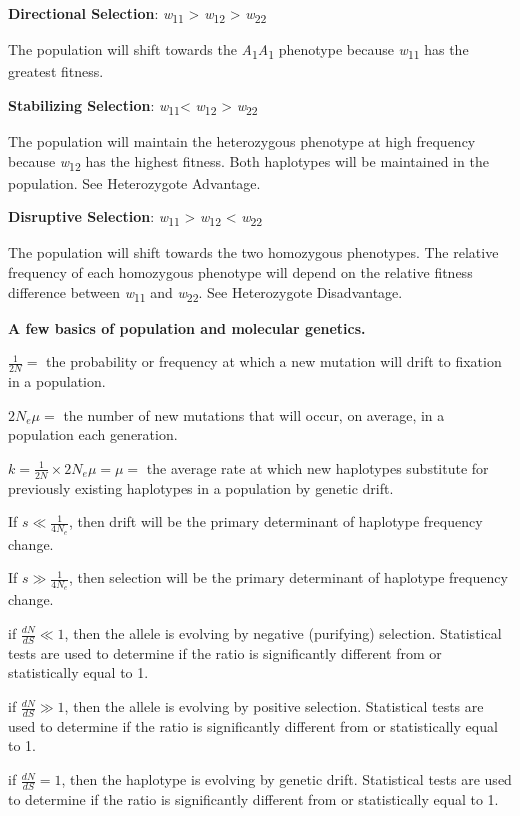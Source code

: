 \documentclass[11pt]{article}
\begin{document}
\textbf{Directional Selection}: \emph{w}\textsubscript{11}
\textgreater{} \emph{w}\textsubscript{12} \textgreater{}
\emph{w}\textsubscript{22}

\qquad The population will shift towards the
\emph{A}\textsubscript{1}\emph{A}\textsubscript{1} phenotype because
\emph{w}\textsubscript{11} has the greatest fitness.\medskip

\textbf{Stabilizing Selection}: \emph{w}\textsubscript{11}\textless{}
\emph{w}\textsubscript{12} \textgreater{} \emph{w}\textsubscript{22}

\qquad The population will maintain the heterozygous phenotype at high
frequency because \emph{w}\textsubscript{12} has the highest fitness.
Both haplotypes will be maintained in the population. See Heterozygote
Advantage.\medskip

\textbf{Disruptive Selection}: \emph{w}\textsubscript{11} \textgreater{}
\emph{w}\textsubscript{12} \textless{} \emph{w}\textsubscript{22}

\qquad The population will shift towards the two homozygous phenotypes. The
relative frequency of each homozygous phenotype will depend on the
relative fitness difference between \emph{w}\textsubscript{11} and
\emph{w}\textsubscript{22}. See Heterozygote Disadvantage.\medskip

\textbf{A few basics of population and molecular genetics.}

$\frac{1}{2N} =$ the probability or frequency at which a new mutation will drift to
fixation in a population.\medskip

$2N_e\mu =$ the number of new mutations that will
occur, on average, in a population each generation.\medskip

$k = \frac{1}{2N} \times 2N_e\mu = \mu =$ the average rate at which new haplotypes substitute for previously
existing haplotypes in a population by genetic drift.\medskip

If $s \ll \frac{1}{4N_e}$, then drift will be the primary determinant of haplotype frequency
change.\medskip

If $s \gg \frac{1}{4N_e}$, then selection will be the primary determinant of haplotype
frequency change.\medskip

if $\frac{dN}{dS} \ll 1$, then the allele is evolving by negative (purifying) selection.
Statistical tests are used to determine if the ratio is significantly
different from or statistically equal to 1.\medskip

if $\frac{dN}{dS} \gg 1$, then the allele is evolving by positive selection. Statistical
tests are used to determine if the ratio is significantly different from
or statistically equal to 1.\medskip

if $\frac{dN}{dS} = 1$, then the haplotype is evolving by genetic drift. Statistical tests
are used to determine if the ratio is significantly different from or
statistically equal to 1.\medskip
\end{document}
